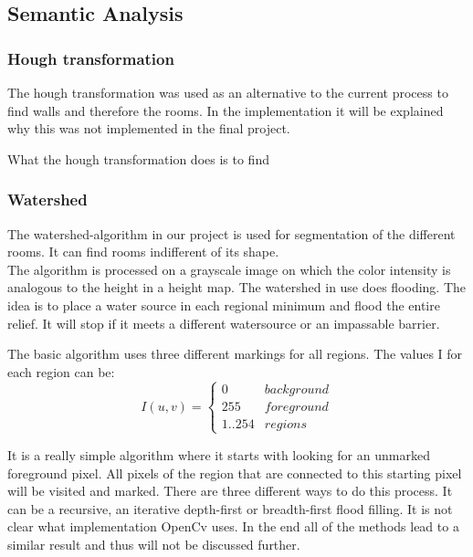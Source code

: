  
\subsection{Semantic Analysis}
\subsubsection{Hough transformation}
The hough transformation was used as an alternative to the current process to find walls and therefore the rooms. In the implementation it will be explained why this was not implemented in the final project.

What the hough transformation does is to find 
\subsubsection{Watershed}
The watershed-algorithm in our project is used for segmentation of the different rooms. It can find rooms indifferent of its shape.
\\
The algorithm is processed on a grayscale image on which the color intensity is analogous to the height in a height map. The watershed in use does flooding. The idea is to place a water source in each regional minimum and flood the entire relief. It will stop if it meets a different watersource or an impassable barrier.

The basic algorithm uses three different markings for all regions. The values I for each region can be:
\[I(u,v) = \begin{cases} 0 & background \\  255 & foreground \\ 1..254 & regions \end{cases} \]

It is a really simple algorithm where it starts with looking for an unmarked foreground pixel. All pixels of the region that are connected to this starting pixel will be visited and marked. There are three different ways to do this process. It can be a recursive, an iterative depth-first or breadth-first flood filling. It is not clear what implementation OpenCv uses. In the end all of the methods lead to a similar result and thus will not be discussed further. 

